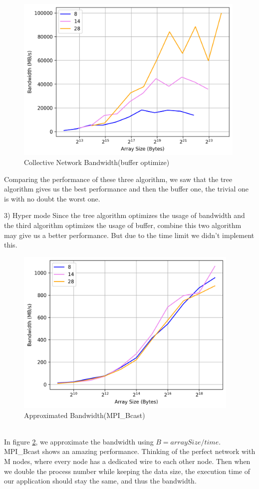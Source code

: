 \documentclass[article]{scrartcl}
\begin{document}
\begin{figure}[htpb]
  \centering
  \includegraphics[width=\textwidth,height=8cm,keepaspectratio=true]{../figs/CollectiveBandwidthBuffer.png}
  \caption{Collective Network Bandwidth(buffer optimize)}
  \label{fig:buffer}
\end{figure}
Comparing the performance of these three algorithm, we saw that the tree algorithm gives us the best performance and then the buffer one, the trivial one is with no doubt the worst one.

3) Hyper mode
Since the tree algorithm optimizes the usage of bandwidth and the third algorithm optimizes the usage of buffer, combine this
two algorithm may give us a better performance. But due to the time limit we didn't implement this.\\
\begin{figure}[htpb]
  \centering
  \includegraphics[width=\textwidth,height=8cm,keepaspectratio=true]{../figs/BandwidthApprox.png}
  \caption{Approximated Bandwidth(MPI\_Bcast) }
  \label{fig:MPIAppro}
\end{figure}
\\
In figure \ref{fig:MPIAppro}, we approximate the bandwidth using $B = arraySize/time$. MPI\_Bcast shows an amazing performance.
Thinking of the perfect network with M nodes, where every node has a dedicated wire to each other node.
Then when we double the process number while keeping the data size, the execution time of our application should stay the same,
and thus the bandwidth.
\end{document}
